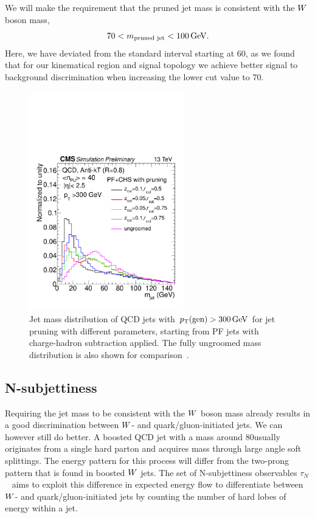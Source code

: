We will make the requirement that the pruned jet mass is consistent with the $W$ boson mass,
\begin{equation}
  70 < m_{\textrm{pruned jet}} < 100 \,\text{Ge\hspace{-.08em}V} .
\end{equation}
Here, we have deviated from the standard interval starting at 60\GeV, as we found that for our
kinematical region and signal topology we achieve better signal to background discrimination when
increasing the lower cut value to 70\GeV. 

\begin{figure}
  \centering
  \includegraphics[width=0.6\textwidth]{figures/razor_wtag/1DPFCHS_PR_QCD}
  \caption{Jet mass distribution of QCD jets with $p_{\mathrm{T}}(\textrm{gen}) > 300 \,\text{Ge\hspace{-.08em}V}$ for jet pruning
with different parameters, starting from PF jets with charge-hadron subtraction applied. The fully
ungroomed mass distribution is also shown for comparison~\cite{CMS-PAS-JME-14-001}. 
  \label{fig:wtag_jet_pruning}}
\end{figure}


\subsection{N-subjettiness}

Requiring the jet mass to be consistent with the $W$ boson mass already results in a good
discrimination between $W$- and quark/gluon-initiated jets. We can however still do better. A
boosted QCD jet with a mass around 80\GeV usually originates from a single hard parton and acquires
mass through large angle soft splittings. The energy pattern for this process will differ from the
two-prong pattern that is found in boosted $W$ jets.  
The set of N-subjettiness observables $\tau_N$~\cite{Thaler:2010tr} aims to exploit this difference
in expected energy flow to differentiate between $W$- and quark/gluon-initiated jets by counting
the number of hard lobes of energy within a jet.


